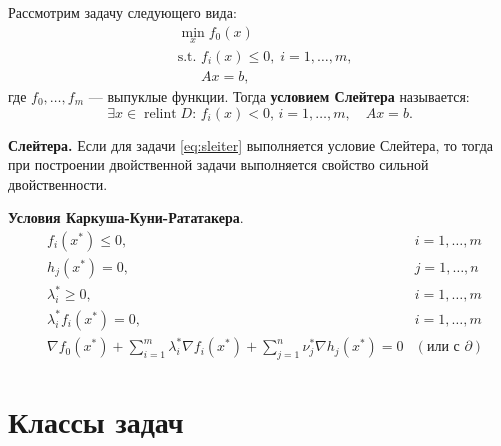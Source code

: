 \begin{definition}
    Рассмотрим задачу следующего вида:
    \begin{equation}
        \begin{aligned}
             & \min_{x} f_0(x)                                 \\
             & \text{s.t. } f_i(x) \leq 0, \; i = 1, \dots, m, \\
             & \phantom{\text{s.t. }} Ax = b,
        \end{aligned}
        \label{eq:sleiter}
    \end{equation}
    где \( f_0, \dots, f_m \) — выпуклые функции. Тогда \textbf{условием Слейтера} называется:
    $$\exists x \in \operatorname{relint} D: \, f_i(x) < 0, \, i = 1, \dots, m, \quad Ax = b.$$
\end{definition}

\begin{theorem}
    \textnormal{\textbf{Слейтера.}} Если для задачи \ref{eq:sleiter} выполняется условие Слейтера,
    то тогда при построении двойственной задачи выполняется свойство сильной двойственности.
\end{theorem}

\begin{definition}
    \textbf{Условия Каркуша-Куни-Рататакера}.
    \begin{equation}
        \begin{aligned}
             & f_i(x^*) \leq 0,                                                                                     & i = 1, \dots, m          \\
             & h_j(x^*) = 0,                                                                                        & j = 1, \dots, n          \\
             & \lambda_i^* \geq 0,                                                                                  & i = 1, \dots, m          \\
             & \lambda_i^* f_i(x^*) = 0,                                                                            & i = 1, \dots, m          \\
             & \nabla f_0(x^*) + \sum_{i=1}^m \lambda_i^* \nabla f_i(x^*) + \sum_{j=1}^n \nu_j^* \nabla h_j(x^*)= 0 & (\text{или с } \partial)
        \end{aligned}
    \end{equation}
\end{definition}

\section*{Классы задач}

